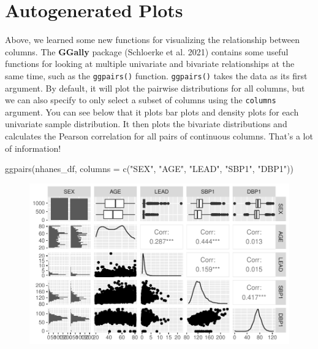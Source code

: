 \documentclass[
  letterpaper,
]{krantz}
\makeatletter
\newenvironment{Shaded}{\begin{snugshade}}{\end{snugshade}}
\newcommand{\AttributeTok}[1]{\textcolor[rgb]{0.40,0.45,0.13}{#1}}
\newcommand{\FunctionTok}[1]{\textcolor[rgb]{0.28,0.35,0.67}{#1}}
\newcommand{\NormalTok}[1]{\textcolor[rgb]{0.00,0.23,0.31}{#1}}
\newcommand{\StringTok}[1]{\textcolor[rgb]{0.13,0.47,0.30}{#1}}
\newenvironment{kframe}{%
\medskip{}
\setlength{\fboxsep}{.8em}
 \def\at@end@of@kframe{}%
 \ifinner\ifhmode%
  \def\at@end@of@kframe{\end{minipage}}%
  \begin{minipage}{\columnwidth}%
 \fi\fi%
 \def\FrameCommand##1{\hskip\@totalleftmargin \hskip-\fboxsep
 \colorbox{shadecolor}{##1}\hskip-\fboxsep
     \hskip-\linewidth \hskip-\@totalleftmargin \hskip\columnwidth}%
 \MakeFramed {\advance\hsize-\width
   \@totalleftmargin\z@ \linewidth\hsize
   \@setminipage}}%
 {\par\unskip\endMakeFramed%
 \at@end@of@kframe}
\renewenvironment{Shaded}{\begin{kframe}}{\end{kframe}}
\makeatother
\begin{document}
\hypertarget{autogenerated-plots}{%
\section{Autogenerated Plots}\label{autogenerated-plots}}

Above, we learned some new functions for visualizing the relationship
between columns. The \textbf{GGally} package (Schloerke et al. 2021)
contains some useful functions for looking at multiple univariate and
bivariate relationships at the same time, such as the \texttt{ggpairs()}
function. \texttt{ggpairs()} takes the data as its first argument. By
default, it will plot the pairwise distributions for all columns, but we
can also specify to only select a subset of columns using the
\texttt{columns} argument. You can see below that it plots bar plots and
density plots for each univariate sample distribution. It then plots the
bivariate distributions and calculates the Pearson correlation for all
pairs of continuous columns. That's a lot of information!

\begin{Shaded}
\begin{Highlighting}[]
\FunctionTok{ggpairs}\NormalTok{(nhanes\_df, }\AttributeTok{columns =} \FunctionTok{c}\NormalTok{(}\StringTok{"SEX"}\NormalTok{, }\StringTok{"AGE"}\NormalTok{, }\StringTok{"LEAD"}\NormalTok{, }\StringTok{"SBP1"}\NormalTok{, }\StringTok{"DBP1"}\NormalTok{))}
\end{Highlighting}
\end{Shaded}

\begin{figure}[H]

{\centering \includegraphics[width=1\textwidth,height=\textheight]{book/4_exploratory_analysis_files/figure-pdf/unnamed-chunk-23-1.pdf}

}

\end{figure}
\end{document}
